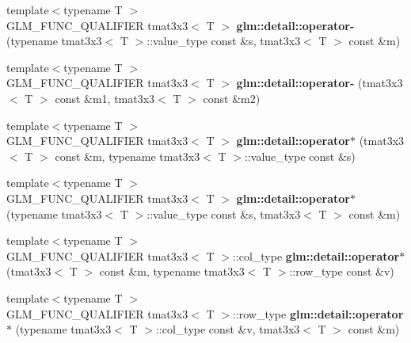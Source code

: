 \begin{DoxyCompactItemize}
\item 
\hypertarget{namespaceglm_1_1detail_a05200abbe69f3b78e9b9f16a45630d60}{}{\footnotesize template$<$typename T $>$ }\\G\+L\+M\+\_\+\+F\+U\+N\+C\+\_\+\+Q\+U\+A\+L\+I\+F\+I\+E\+R tmat3x3$<$ T $>$ {\bfseries glm\+::detail\+::operator-\/} (typename tmat3x3$<$ T $>$\+::value\+\_\+type const \&s, tmat3x3$<$ T $>$ const \&m)\label{namespaceglm_1_1detail_a05200abbe69f3b78e9b9f16a45630d60}

\item 
\hypertarget{namespaceglm_1_1detail_ab96738489ab488d649f649b052b6e74a}{}{\footnotesize template$<$typename T $>$ }\\G\+L\+M\+\_\+\+F\+U\+N\+C\+\_\+\+Q\+U\+A\+L\+I\+F\+I\+E\+R tmat3x3$<$ T $>$ {\bfseries glm\+::detail\+::operator-\/} (tmat3x3$<$ T $>$ const \&m1, tmat3x3$<$ T $>$ const \&m2)\label{namespaceglm_1_1detail_ab96738489ab488d649f649b052b6e74a}

\item 
\hypertarget{namespaceglm_1_1detail_ab075b7e9145c0c0892052b7e38451868}{}{\footnotesize template$<$typename T $>$ }\\G\+L\+M\+\_\+\+F\+U\+N\+C\+\_\+\+Q\+U\+A\+L\+I\+F\+I\+E\+R tmat3x3$<$ T $>$ {\bfseries glm\+::detail\+::operator$\ast$} (tmat3x3$<$ T $>$ const \&m, typename tmat3x3$<$ T $>$\+::value\+\_\+type const \&s)\label{namespaceglm_1_1detail_ab075b7e9145c0c0892052b7e38451868}

\item 
\hypertarget{namespaceglm_1_1detail_a602575d0150ac614e3018d945ef31522}{}{\footnotesize template$<$typename T $>$ }\\G\+L\+M\+\_\+\+F\+U\+N\+C\+\_\+\+Q\+U\+A\+L\+I\+F\+I\+E\+R tmat3x3$<$ T $>$ {\bfseries glm\+::detail\+::operator$\ast$} (typename tmat3x3$<$ T $>$\+::value\+\_\+type const \&s, tmat3x3$<$ T $>$ const \&m)\label{namespaceglm_1_1detail_a602575d0150ac614e3018d945ef31522}

\item 
\hypertarget{namespaceglm_1_1detail_a20e9e4ae1d4b6269af47d45c32165ead}{}{\footnotesize template$<$typename T $>$ }\\G\+L\+M\+\_\+\+F\+U\+N\+C\+\_\+\+Q\+U\+A\+L\+I\+F\+I\+E\+R tmat3x3$<$ T $>$\+::col\+\_\+type {\bfseries glm\+::detail\+::operator$\ast$} (tmat3x3$<$ T $>$ const \&m, typename tmat3x3$<$ T $>$\+::row\+\_\+type const \&v)\label{namespaceglm_1_1detail_a20e9e4ae1d4b6269af47d45c32165ead}

\item 
\hypertarget{namespaceglm_1_1detail_a2b76346067dd63fab9e3cfa397259b3b}{}{\footnotesize template$<$typename T $>$ }\\G\+L\+M\+\_\+\+F\+U\+N\+C\+\_\+\+Q\+U\+A\+L\+I\+F\+I\+E\+R tmat3x3$<$ T $>$\+::row\+\_\+type {\bfseries glm\+::detail\+::operator$\ast$} (typename tmat3x3$<$ T $>$\+::col\+\_\+type const \&v, tmat3x3$<$ T $>$ const \&m)\label{namespaceglm_1_1detail_a2b76346067dd63fab9e3cfa397259b3b}


\end{DoxyCompactItemize}
